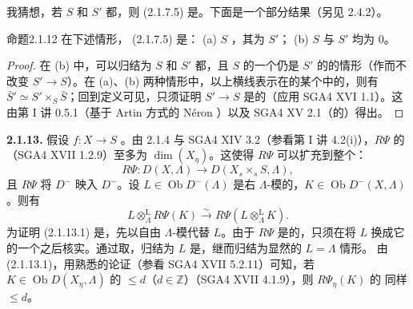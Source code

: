 我猜想，若 $S$ 和 $S'$ 都，则 (2.1.7.5) 是。下面是一个部分结果（另见 2.4.2）。
\begin{SGAresult}{命题}{2.1.12}
在下述情形， (2.1.7.5) 是：
(a) $S$ ，其为 $S'$；
(b) $S$ 与 $S'$ 均为 $0$。
\end{SGAresult}
\begin{proof}
在 (b) 中，可以归结为 $S$ 和 $S'$ 都，且 $S$ 的一个仍是 $S'$ 的的情形（作而不改变 $S'\to S$）。在 (a)、(b) 两种情形中，以上横线表示在的某个中的，则有 $\bar S'\simeq S'\times_S\bar S$；回到定义可见，只须证明 $S'\to S$ 是的（应用 SGA4 XVI 1.1）。这由第 I 讲 0.5.1（基于 Artin 方式的 Néron ）以及 SGA4 XV 2.1（的）得出。
\end{proof}
\textbf{2.1.13.} 假设 $f:X\to S$ 。由 2.1.4 与 SGA4 XIV 3.2（参看第 I 讲 4.2(i)），$R\Psi$ 的（SGA4 XVII 1.2.9）至多为 $\dim(X_\eta)$。这使得 $R\Psi$ 可以扩充到整个：
\[R\Psi:D(X,\Lambda)\longrightarrow D(X_s\times_sS,\Lambda),\]
且 $R\Psi$ 将 $D^-$ 映入 $D^-$。设 $L\in\operatorname{Ob}D^-(\Lambda)$ 是右 $\Lambda$-模的，$K\in\operatorname{Ob}D^-(X,\Lambda)$。则有
\[L\mathbin{\mathop\otimes^{\mathrm L}_{\Lambda}}R\Psi(K)\xrightarrow\sim R\Psi(L\mathbin{\mathop\otimes^{\mathrm L}_{\Lambda}}K).\tag{2.1.13.1}\]
为证明 (2.1.13.1) 是，先以自由 $\Lambda$-模代替 $L$。由于 $R\Psi$ 是的，只须在将 $L$ 换成它的一个之后核实。通过取，归结为 $L$ 是，继而归结为显然的 $L=\Lambda$ 情形。
由 (2.1.13.1)，用熟悉的论证（参看 SGA4 XVII 5.2.11）可知，若 $K\in\operatorname{Ob}D(X_\eta,\Lambda)$ 的 $\le d$（$d\in\mathbb Z$）（SGA4 XVII 4.1.9），则 $R\Psi_\eta(K)$ 的 同样 $\le d$。
